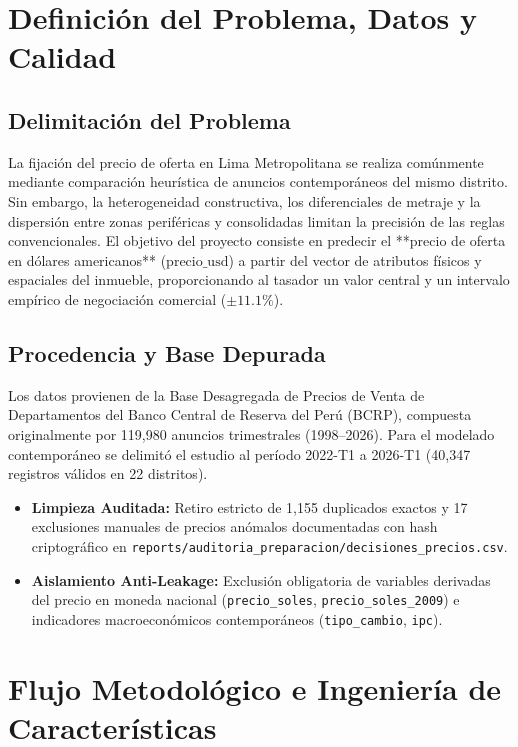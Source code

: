 \documentclass[11pt,a4paper]{article}
\begin{document}
\section{Definición del Problema, Datos y Calidad}

\subsection{Delimitación del Problema}
La fijación del precio de oferta en Lima Metropolitana se realiza comúnmente mediante comparación heurística de anuncios contemporáneos del mismo distrito. Sin embargo, la heterogeneidad constructiva, los diferenciales de metraje y la dispersión entre zonas periféricas y consolidadas limitan la precisión de las reglas convencionales. El objetivo del proyecto consiste en predecir el **precio de oferta en dólares americanos** ($\text{precio\_usd}$) a partir del vector de atributos físicos y espaciales del inmueble, proporcionando al tasador un valor central y un intervalo empírico de negociación comercial ($\pm 11.1\%$).

\subsection{Procedencia y Base Depurada}
Los datos provienen de la Base Desagregada de Precios de Venta de Departamentos del Banco Central de Reserva del Perú (BCRP), compuesta originalmente por 119,980 anuncios trimestrales (1998--2026). Para el modelado contemporáneo se delimitó el estudio al período 2022-T1 a 2026-T1 (40,347 registros válidos en 22 distritos).
\begin{itemize}[leftmargin=*]
    \item \textbf{Limpieza Auditada:} Retiro estricto de 1,155 duplicados exactos y 17 exclusiones manuales de precios anómalos documentadas con hash criptográfico en \texttt{reports/auditoria\_preparacion/decisiones\_precios.csv}.
    \item \textbf{Aislamiento Anti-Leakage:} Exclusión obligatoria de variables derivadas del precio en moneda nacional (\texttt{precio\_soles}, \texttt{precio\_soles\_2009}) e indicadores macroeconómicos contemporáneos (\texttt{tipo\_cambio}, \texttt{ipc}).
\end{itemize}

\section{Flujo Metodológico e Ingeniería de Características}
\end{document}
